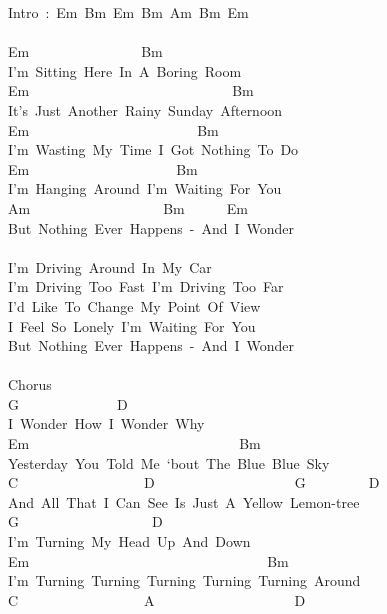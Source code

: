 \documentclass[]{book}
\begin{document}
Intro~:~Em~Bm~Em~Bm~Am~Bm~Em\\
~\\
Em~~~~~~~~~~~~~~~~Bm\\
I'm~Sitting~Here~In~A~Boring~Room\\
Em~~~~~~~~~~~~~~~~~~~~~~~~~~~~~Bm\\
It's~Just~Another~Rainy~Sunday~Afternoon\\
Em~~~~~~~~~~~~~~~~~~~~~~~~Bm\\
I'm~Wasting~My~Time~I~Got~Nothing~To~Do\\
Em~~~~~~~~~~~~~~~~~~~~~Bm\\
I'm~Hanging~Around~I'm~Waiting~For~You\\
\hspace*{0.333em}\hspace*{0.333em}\hspace*{0.333em}\hspace*{0.333em}Am~~~~~~~~~~~~~~~~~~~Bm~~~~~~Em\\
But~Nothing~Ever~Happens~-~And~I~Wonder\\
~\\
I'm~Driving~Around~In~My~Car\\
I'm~Driving~Too~Fast~I'm~Driving~Too~Far\\
I'd~Like~To~Change~My~Point~Of~View\\
I~Feel~So~Lonely~I'm~Waiting~For~You\\
But~Nothing~Ever~Happens~-~And~I~Wonder\\
~\\
Chorus\\
G~~~~~~~~~~~~~~D\\
I~Wonder~How~I~Wonder~Why\\
Em~~~~~~~~~~~~~~~~~~~~~~~~~~~~~~Bm\\
Yesterday~You~Told~Me~`bout~The~Blue~Blue~Sky\\
C~~~~~~~~~~~~~~~~~~D~~~~~~~~~~~~~~~~~~~~G~~~~~~~~~D\\
And~All~That~I~Can~See~Is~Just~A~Yellow~Lemon-tree\\
G~~~~~~~~~~~~~~~~~~~D\\
I'm~Turning~My~Head~Up~And~Down\\
\hspace*{0.333em}Em~~~~~~~~~~~~~~~~~~~~~~~~~~~~~~~~~~Bm\\
\hspace*{0.333em}I'm~Turning~Turning~Turning~Turning~Turning~Around\\
C~~~~~~~~~~~~~~~~~~A~~~~~~~~~~~~~~~~~~~~D\\
\end{document}
